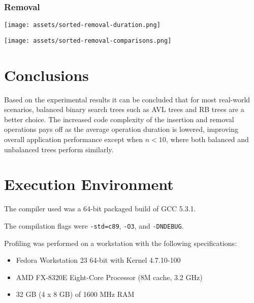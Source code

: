 \documentclass[12pt]{elsarticle}
\begin{document}
\subsubsection{Removal}
\begin{center}\texttt{[image: assets/sorted-removal-duration.png]}\end{center}
\begin{center}\texttt{[image: assets/sorted-removal-comparisons.png]}\end{center}

\section{Conclusions}

Based on the experimental results it can be concluded that for most real-world
scenarios, balanced binary search trees such as AVL trees and RB trees are a
better choice. The increased code complexity of the insertion and removal
operations pays off as the average operation duration is lowered, improving
overall application performance except when \(n < 10\), where both balanced and
unbalanced trees perform similarly.

\appendix

\section{Execution Environment} \label{ap:ENV}

The compiler used was a 64-bit packaged build of GCC 5.3.1.

The compilation flags were \texttt{-std=c89}, \texttt{-O3}, and
\texttt{-DNDEBUG}.

Profiling was performed on a workstation with the following specifications:
\begin{itemize}
    \item Fedora Workstation 23 64-bit with Kernel 4.7.10-100
    \item AMD FX-8320E Eight-Core Processor (8M cache, 3.2 GHz)
    \item 32 GB (4 x 8 GB) of 1600 MHz RAM
\end{itemize}
\end{document}

